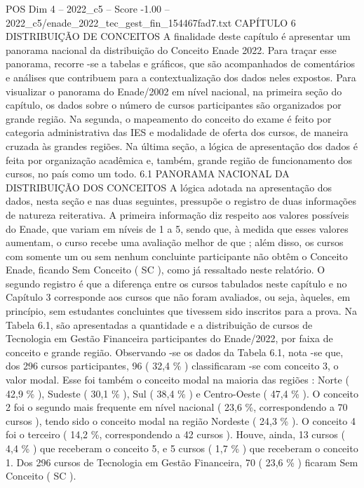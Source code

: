 \begin{textsample}{POS Dim 4 – 2022\_c5 – Score -1.00 – 2022\_c5/enade\_2022\_tec\_gest\_fin\_154467fad7.txt}  \label{ex:f4_pos_286}
CAPÍTULO 6 DISTRIBUIÇÃO DE CONCEITOS A finalidade deste capítulo é apresentar um panorama nacional da distribuição do Conceito Enade 2022.
Para traçar esse panorama, recorre -se a tabelas e gráficos, que são acompanhados de comentários e análises que contribuem para a contextualização dos dados neles expostos.
Para visualizar o panorama do Enade/2002 em nível nacional, na primeira seção do capítulo, os dados sobre o número de cursos participantes são organizados por grande região.
Na segunda, o mapeamento do conceito do exame é feito por categoria administrativa das IES e modalidade de oferta dos cursos, de maneira cruzada às grandes regiões.
Na última seção, a lógica de apresentação dos dados é feita por organização acadêmica e, também, grande região de funcionamento dos cursos, no país como um todo. 6.1 PANORAMA NACIONAL DA DISTRIBUIÇÃO DOS CONCEITOS A lógica adotada na apresentação dos dados, nesta seção e nas duas seguintes, pressupõe o registro de duas informações de natureza reiterativa.
A primeira informação diz respeito aos valores possíveis do Enade, que variam em níveis de 1 a 5, sendo que, à medida que esses valores aumentam, o curso recebe uma avaliação melhor de que ; além disso, os cursos com somente um ou sem nenhum concluinte participante não obtêm o Conceito Enade, ficando Sem Conceito ( SC ), como já ressaltado neste relatório.
O segundo registro é que a diferença entre os cursos tabulados neste capítulo e no Capítulo 3 corresponde aos cursos que não foram avaliados, ou seja, àqueles, em princípio, sem estudantes concluintes que tivessem sido inscritos para a prova.
Na Tabela 6.1, são apresentadas a quantidade e a distribuição de cursos de Tecnologia em Gestão Financeira participantes do Enade/2022, por faixa de conceito e grande região.
Observando -se os dados da Tabela 6.1, nota -se que, dos 296 cursos participantes, 96 ( 32,4 \% ) classificaram -se com conceito 3, o valor modal.
Esse foi também o conceito modal na maioria das regiões : Norte ( 42,9 \% ), Sudeste ( 30,1 \% ), Sul ( 38,4 \% ) e Centro-Oeste ( 47,4 \% ).
O conceito 2 foi o segundo mais frequente em nível nacional ( 23,6 \%, correspondendo a 70 cursos ), tendo sido o conceito modal na região Nordeste ( 24,3 \% ).
O conceito 4 foi o terceiro ( 14,2 \%, correspondendo a 42 cursos ).
Houve, ainda, 13 cursos ( 4,4 \% ) que receberam o conceito 5, e 5 cursos ( 1,7 \% ) que receberam o conceito 1.
Dos 296 cursos de Tecnologia em Gestão Financeira, 70 ( 23,6 \% ) ficaram Sem Conceito ( SC ).

\end{textsample}
